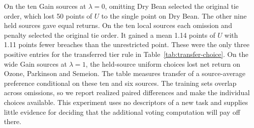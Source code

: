 On the ten Gain sources at $\lambda=0$, omitting Dry Bean selected the original tie order, which lost 50 points of $U$ to the single point on Dry Bean. The other nine held sources gave equal returns. On the ten local sources each omission and penalty selected the original tie order. It gained a mean 1.14 points of $U$ with 1.11 points fewer breaches than the unrestricted point. These were the only three positive entries for the transferred tier rule in Table~\ref{tab:transfer-choice}. On the wide Gain sources at $\lambda=1$, the held-source uniform choices lost net return on Ozone, Parkinson and Semeion. The table measures transfer of a source-average preference conditional on these ten and six sources. The training sets overlap across omissions, so we report realized paired differences and make the individual choices available. This experiment uses no descriptors of a new task and supplies little evidence for deciding that the additional voting computation will pay off there.
